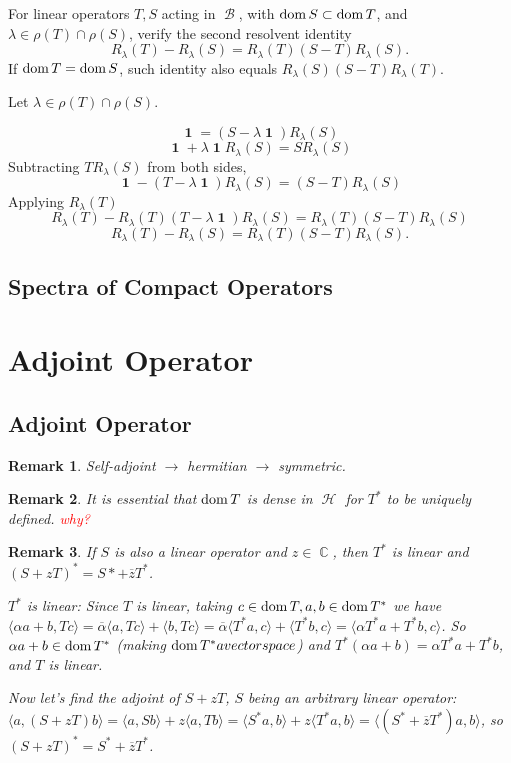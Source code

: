 \documentclass{article}
\theoremstyle{exercisestyle}
\newenvironment{exercise}[1]
  {\renewcommand\theinnerex{#1}\innerex}
  {\endinnerex}
\newtheorem{remark}{Remark}[subsection]
\DeclareMathOperator{\Complex}{\mathbb{C}}
\DeclareMathOperator{\banach}{\mathcal{B}}
\DeclareMathOperator{\hilbert}{\mathcal{H}}
\DeclareMathOperator{\Id}{\textbf{1}}
\newcommand{\inner}[2]{\langle #1, #2 \rangle}
\newcommand{\conj}[1]{\overline{#1}}
\begin{document}
\begin{exercise}{1.5.10}
    For linear operators $T, S$ acting in $\banach$, with $\operatorname{dom} S \subset \operatorname{dom} T$, and
    $\lambda \in \rho(T) \cap \rho(S)$, verify the second resolvent identity
    $$R_\lambda (T) - R_\lambda (S) = R_\lambda (T)(S - T)R_\lambda(S).$$
    If $\operatorname{dom} T = \operatorname{dom} S$, such identity also equals $R_\lambda (S)(S - T)R_\lambda (T)$.

    Let $\lambda \in \rho(T)\cap\rho(S)$.

    $$ \Id = (S - \lambda \Id) R_\lambda(S) $$
    $$ \Id + \lambda \Id  R_\lambda(S)  = S R_\lambda(S) $$
    Subtracting $T R_\lambda(S)$ from both sides,
    $$ \Id - (T-\lambda \Id)R_\lambda(S) = (S-T)R_\lambda(S) $$
    Applying $R_\lambda(T)$
    $$ R_\lambda(T) - R_\lambda(T) (T-\lambda \Id)R_\lambda(S) =  R_\lambda(T)(S-T)R_\lambda(S)  $$
    $$ R_\lambda(T) - R_\lambda(S) =  R_\lambda(T)(S-T)R_\lambda(S).$$

\end{exercise}

\subsection{Spectra of Compact Operators}

\section{Adjoint Operator}

\subsection{Adjoint Operator}

\begin{remark}
    Self-adjoint $\to$ hermitian $\to$ symmetric.
\end{remark}

\begin{remark}
    It is essential that $\operatorname{dom} T$ is dense in $\hilbert$ for $T^*$ to be uniquely defined. \textcolor{red}{why?}
\end{remark}

\begin{remark}
    If $S$ is also a linear operator and $z \in \Complex$, then $T^*$ is linear and $(S + z T)^* =  S* + \overline{z}T^*$.

    $T^*$ is linear: Since $T$ is linear, taking $c \in \operatorname{dom} T, a, b \in \operatorname{dom} T^*$ we have $\inner{\alpha a + b}{T c} = \conj{\alpha}\inner{a}{T c} + \inner{b}{T c}
        = \conj{\alpha}\inner{T^* a}{c} + \inner{ T^* b}{c} = \inner{\alpha T^* a + T^* b}{c}$. So $\alpha a + b \in \operatorname{dom} T^*$ (making $\operatorname{dom} T^* a vector space$) and
    $T^*(\alpha a + b) = \alpha T^* a + T^* b$, and $T$ is linear.

    Now let's find the adjoint of $S + zT$, $S$ being an arbitrary linear operator: $\inner{a}{(S + zT)b} = \inner{a}{S b} + z \inner{a}{T b} =
        \inner{S^* a}{b} + z \inner{T^* a}{b} = \inner{(S^* + \conj{z} T^*)a}{b}$, so $(S + zT)^* = S^* + \conj{z} T^*$.


\end{remark}
\end{document}
